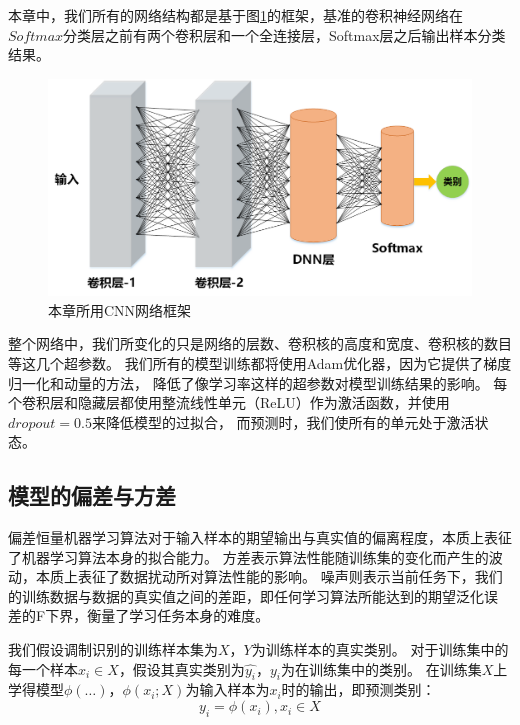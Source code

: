 本章中，我们所有的网络结构都是基于图\ref{fig_5_0}的框架，基准的卷积神经网络在$Softmax$分类层之前有两个卷积层和一个全连接层，Softmax层之后输出样本分类结果。\par
\begin{figure}[!htbp]
	\centering
	\includegraphics[scale=0.6]{figures/chapter_5/fig_5_0}
	\caption{本章所用CNN网络框架}
	\label{fig_5_0}
\end{figure}

整个网络中，我们所变化的只是网络的层数、卷积核的高度和宽度、卷积核的数目等这几个超参数。
我们所有的模型训练都将使用Adam优化器，因为它提供了梯度归一化和动量的方法，
降低了像学习率这样的超参数对模型训练结果的影响。
每个卷积层和隐藏层都使用整流线性单元（ReLU）作为激活函数，并使用$dropout=0.5$来降低模型的过拟合，
而预测时，我们使所有的单元处于激活状态。\par

\subsection{模型的偏差与方差}
\label{sec_5_2_1}
偏差恒量机器学习算法对于输入样本的期望输出与真实值的偏离程度，本质上表征了机器学习算法本身的拟合能力。
方差表示算法性能随训练集的变化而产生的波动，本质上表征了数据扰动所对算法性能的影响。
噪声则表示当前任务下，我们的训练数据与数据的真实值之间的差距，即任何学习算法所能达到的期望泛化误
差的F下界，衡量了学习任务本身的难度。\par

我们假设调制识别的训练样本集为$X$，$Y$为训练样本的真实类别。
对于训练集中的每一个样本$x_i \in X$，假设其真实类别为$\hat{y_i}$，$y_i$为在训练集中的类别。
在训练集$X$上学得模型$\phi(\dots)$，$\phi(x_i; X)$为输入样本为$x_i$时的输出，即预测类别：
\begin{equation}
	\label{eqt_5_2}
	y_i = \phi(x_i), x_i \in X
\end{equation}

